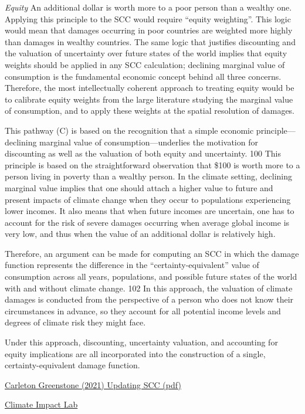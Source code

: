 \documentclass[
]{book}
\begin{document}
\emph{Equity}
An additional dollar is worth more to a poor person than a wealthy one.
Applying this principle to the SCC would require ``equity weighting''.
This logic would mean
that damages occurring in poor countries are weighted more highly than damages in
wealthy countries.
The same logic that justifies discounting and the valuation of uncertainty over
future states of the world implies that equity weights should be applied in any SCC
calculation; declining marginal value of consumption is the fundamental economic
concept behind all three concerns. Therefore, the most intellectually coherent approach
to treating equity would be to calibrate equity weights from the large literature studying
the marginal value of consumption, and to apply these weights at the spatial resolution
of damages.

This pathway (C) is based on the recognition that a simple economic principle---declining
marginal value of consumption---underlies the motivation for discounting as well as the
valuation of both equity and uncertainty. 100 This principle is based on the
straightforward observation that \$100 is worth more to a person living in poverty than a
wealthy person. In the climate setting, declining marginal value implies that one should
attach a higher value to future and present impacts of climate change when they occur
to populations experiencing lower incomes. It also means that when future incomes are
uncertain, one has to account for the risk of severe damages occurring when average
global income is very low, and thus when the value of an additional dollar is relatively
high.

Therefore, an argument can be made for computing an SCC in which the damage
function represents the difference in the ``certainty-equivalent'' value of consumption
across all years, populations, and possible future states of the world with and without
climate change. 102 In this approach, the valuation of climate damages is conducted from
the perspective of a person who does not know their circumstances in advance, so they
account for all potential income levels and degrees of climate risk they might face.

Under this approach, discounting, uncertainty valuation, and accounting for equity
implications are all incorporated into the construction of a single, certainty-equivalent
damage function.

\href{Greenstone_2021_Updating_SCC.pdf}{Carleton Greenstone (2021) Updating SCC (pdf)}

\href{http://www.impactlab.org/}{Climate Impact Lab}
\end{document}
